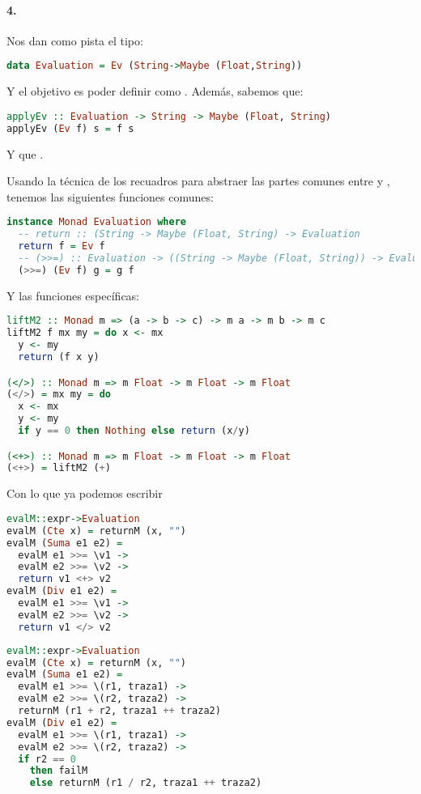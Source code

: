\paragraph{4.} Nos dan como pista el tipo:
\begin{lstlisting}[language=Haskell]
data Evaluation = Ev (String->Maybe (Float,String))
\end{lstlisting}

Y el objetivo es poder definir  como . Además, sabemos que:
\begin{lstlisting}[language=Haskell]
applyEv :: Evaluation -> String -> Maybe (Float, String)
applyEv (Ev f) s = f s
\end{lstlisting}

Y que .

Usando la técnica de los recuadros para abstraer las partes comunes entre  y , tenemos las siguientes funciones comunes:

\begin{lstlisting}[language=Haskell]
instance Monad Evaluation where
  -- return :: (String -> Maybe (Float, String) -> Evaluation
  return f = Ev f
  -- (>>=) :: Evaluation -> ((String -> Maybe (Float, String)) -> Evaluation) -> Evaluation
  (>>=) (Ev f) g = g f
\end{lstlisting}

Y las funciones específicas:

\begin{lstlisting}[language=Haskell]
liftM2 :: Monad m => (a -> b -> c) -> m a -> m b -> m c
liftM2 f mx my = do x <- mx
  y <- my
  return (f x y)

(</>) :: Monad m => m Float -> m Float -> m Float
(</>) = mx my = do
  x <- mx
  y <- my
  if y == 0 then Nothing else return (x/y)

(<+>) :: Monad m => m Float -> m Float -> m Float
(<+>) = liftM2 (+)
\end{lstlisting}

Con lo que ya podemos escribir

\begin{lstlisting}[language=Haskell]
evalM::expr->Evaluation
evalM (Cte x) = returnM (x, "")
evalM (Suma e1 e2) =
  evalM e1 >>= \v1 ->
  evalM e2 >>= \v2 ->
  return v1 <+> v2
evalM (Div e1 e2) =
  evalM e1 >>= \v1 ->
  evalM e2 >>= \v2 ->
  return v1 </> v2
\end{lstlisting}

\begin{lstlisting}[language=Haskell]
evalM::expr->Evaluation
evalM (Cte x) = returnM (x, "")
evalM (Suma e1 e2) =
  evalM e1 >>= \(r1, traza1) ->
  evalM e2 >>= \(r2, traza2) ->
  returnM (r1 + r2, traza1 ++ traza2)
evalM (Div e1 e2) =
  evalM e1 >>= \(r1, traza1) ->
  evalM e2 >>= \(r2, traza2) ->
  if r2 == 0
    then failM
    else returnM (r1 / r2, traza1 ++ traza2)
\end{lstlisting}

